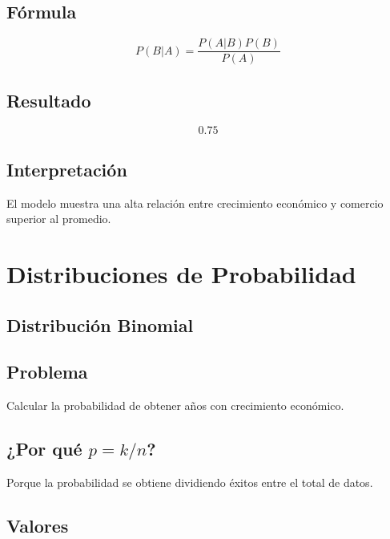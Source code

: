 \documentclass[12pt]{article}
\begin{document}
\subsection*{Fórmula}

\[
P(B|A)=\frac{P(A|B)P(B)}{P(A)}
\]

\subsection*{Resultado}

\[
0.75
\]

\subsection*{Interpretación}

El modelo muestra una alta relación entre crecimiento económico y comercio superior al promedio.


\section{Distribuciones de Probabilidad}


\subsection{Distribución Binomial}

\subsection*{Problema}

Calcular la probabilidad de obtener años con crecimiento económico.

\subsection*{¿Por qué \(p=k/n\)?}

Porque la probabilidad se obtiene dividiendo éxitos entre el total de datos.

\subsection*{Valores}
\end{document}
